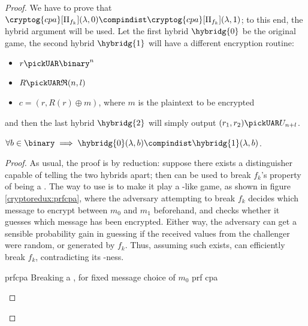 \begin{proof}
    We have to prove that $\cryptog{cpa}[\Pi_{f_k}](\lambda, 0) \compindist \cryptog{cpa}[\Pi_{f_k}](\lambda, 1)$; to this end, the hybrid argument will be used. Let the first hybrid $\hybridg{0}$ be the original game, the second hybrid $\hybridg{1}$ will have a different encryption routine:

    \begin{itemize}
        \item $r \pickUAR \binary^n$
        \item $R \pickUAR \mathfrak{R}(n, l)$
        \item $c = (r, R(r) \oplus m)$, where $m$ is the plaintext to be encrypted
    \end{itemize}

    and then the last hybrid $\hybridg{2}$ will simply output $(r_1, r_2) \pickUAR U_{n + l}$.

    \begin{lemma}
        $\forall b \in \binary \implies \hybridg{0}(\lambda, b) \compindist \hybridg{1}(\lambda, b)$.
    \end{lemma}

    \begin{proof}
        As usual, the proof is by reduction: suppose there exists a distinguisher \distinguisher{} capable of telling the two hybrids apart; then \distinguisher{} can be used to break $f_k$'s property of being a \prf. The way to use \distinguisher{} is to make it play a \cpa-like game, as shown in figure \ref{cryptoredux:prfcpa}\footnotemark, where the adversary attempting to break $f_k$ decides which message to encrypt between $m_0$ and $m_1$ beforehand, and checks whether it guesses which message has been encrypted. Either way, the adversary can get a sensible probability gain in guessing if the received values from the challenger were random, or generated by $f_k$. Thus, assuming such \distinguisher{} exists, \adversary{} can efficiently break $f_k$, contradicting its \prf-ness.



        \begin{cryptoredux}
            {prfcpa}
            {Breaking a \prf, for fixed message choice of $m_0$}
            {prf}
            {cpa}


\end{cryptoredux}
\end{proof}
\end{proof}
